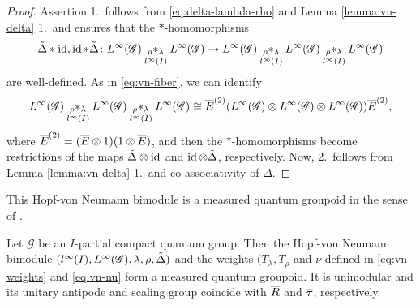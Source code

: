 \begin{proof}
Assertion 1.\ follows from \eqref{eq:delta-lambda-rho} and
Lemma \ref{lemma:vn-delta} 1.\ and ensures that  the $*$-homo\-morphisms
\begin{align*}
  \tilde\Delta \ast \operatorname{id}, \operatorname{id} \ast \tilde\Delta \colon  L^{\infty}(\mathscr{G}) \underset{l^{\infty}(I)}{_{\rho}\ast_{\lambda}} L^{\infty}(\mathscr{G})
  \to L^{\infty}(\mathscr{G}) \underset{l^{\infty}(I)}{_{\rho}\ast_{\lambda}} L^{\infty}(\mathscr{G}) \underset{l^{\infty}(I)}{_{\rho}\ast_{\lambda}} L^{\infty}(\mathscr{G})
\end{align*}
are well-defined.  As in
\eqref{eq:vn-fiber}, we can identify
\begin{align*}
 L^{\infty}(\mathscr{G}) \underset{l^{\infty}(I)}{_{\rho}\ast_{\lambda}} L^{\infty}(\mathscr{G}) \underset{l^{\infty}(I)}{_{\rho}\ast_{\lambda}} L^{\infty}(\mathscr{G}) \cong \overline{E}^{(2)}(L^{\infty}(\mathscr{G})
  \otimes L^{\infty}(\mathscr{G}) \otimes L^{\infty}(\mathscr{G}))\overline{E}^{(2)},
\end{align*}
where $\overline{E}^{(2)}=(\overline{E} \otimes 1)(1 \otimes \overline{E})$, and then the
$*$-homomorphisms become restrictions of the maps $\tilde\Delta \otimes
\operatorname{id}$ and $\operatorname{id} \otimes \tilde\Delta$, respectively. Now, 2.\ follows from
Lemma \ref{lemma:vn-delta} 1.\ and co-associativity of $\Delta$.
\end{proof}
This Hopf-von Neumann bimodule is a measured quantum groupoid in the
sense of \cite{}.
\begin{Theorem} \label{theorem:vn-measured} Let $\mathscr{G}$ be an
  $I$-partial compact quantum group. Then the Hopf-von Neumann
  bimodule $(l^{\infty}(I),L^{\infty}(\mathscr{G}),\lambda,\rho,\tilde\Delta)$ and the
  weights $(T_{\lambda},T_{\rho}$ and $\nu$ defined in
  \eqref{eq:vn-weights} and \eqref{eq:vn-nu} form a measured quantum
  groupoid.  It is unimodular and its unitary antipode and scaling
  group coincide with $\overline{R}$ and $\overline{\tau}$, respectively.
\end{Theorem}
